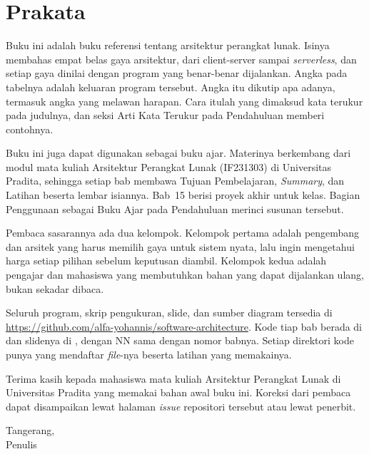 \chapter{Prakata}

Buku ini adalah buku referensi tentang arsitektur perangkat lunak. Isinya
membahas empat belas gaya arsitektur, dari client-server sampai
\textit{serverless}, dan setiap gaya dinilai dengan program yang benar-benar
dijalankan. Angka pada tabelnya adalah keluaran program tersebut. Angka itu
dikutip apa adanya, termasuk angka yang melawan harapan. Cara itulah yang
dimaksud kata terukur pada judulnya, dan seksi Arti Kata Terukur pada
Pendahuluan memberi contohnya.

Buku ini juga dapat digunakan sebagai buku ajar. Materinya berkembang dari modul
mata kuliah Arsitektur Perangkat Lunak (IF231303) di Universitas Pradita,
sehingga setiap bab membawa Tujuan Pembelajaran, \textit{Summary}, dan Latihan
beserta lembar isiannya. Bab~15 berisi proyek akhir untuk kelas. Bagian
Penggunaan sebagai Buku Ajar pada Pendahuluan merinci susunan tersebut.

Pembaca sasarannya ada dua kelompok. Kelompok pertama adalah pengembang dan
arsitek yang harus memilih gaya untuk sistem nyata, lalu ingin mengetahui harga
setiap pilihan sebelum keputusan diambil. Kelompok kedua adalah pengajar dan
mahasiswa yang membutuhkan bahan yang dapat dijalankan ulang, bukan sekadar
dibaca.

Seluruh program, skrip pengukuran, slide, dan sumber diagram tersedia di
\url{https://github.com/alfa-yohannis/software-architecture}. Kode tiap bab
berada di  dan slidenya di
, dengan NN sama dengan nomor babnya. Setiap direktori
kode punya  yang mendaftar \textit{file}-nya beserta latihan
yang memakainya.

Terima kasih kepada mahasiswa mata kuliah Arsitektur Perangkat Lunak di
Universitas Pradita yang memakai bahan awal buku ini. Koreksi dari pembaca dapat
disampaikan lewat halaman \textit{issue} repositori tersebut atau lewat
penerbit.

\bigskip
\begin{flushright}
  Tangerang, \\[4pt]
  Penulis
\end{flushright}
